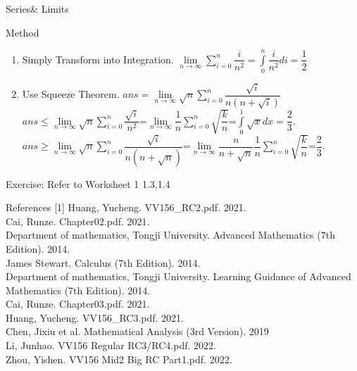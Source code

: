 \documentclass{beamer}
\begin{document}
\begin{frame}{Series\& Limits}
    
    \begin{block}{Method}
    \begin{enumerate}
        \item Simply Transform into Integration.
        $\lim\limits_{n\to\infty}\sum\limits_{i=0}^{n}\dfrac{i}{n^2}=\int\limits_0^n \dfrac{i}{n^2} di=\dfrac{1}{2} $
        \item Use Squeeze Theorem.
        $ans=\lim\limits_{n\to\infty}\sqrt{n}\sum\limits_{i=0}^{n}\dfrac{\sqrt{i}}{n(n+\sqrt{i})}$\\
        $ans\leq\lim\limits_{n\to\infty}\sqrt{n}\sum\limits_{i=0}^{n}\dfrac{\sqrt{i}}{n^2}$=$\lim\limits_{n\to\infty}\dfrac{1}{n}\sum\limits_{i=0}^{n}\sqrt{\dfrac{k}{n}}$=$\int\limits_0^1 \sqrt{x}dx=\dfrac{2}{3}$.\\
        $ans\geq \lim\limits_{n\to\infty}\sqrt{n}\sum\limits_{i=0}^{n}\dfrac{\sqrt{i}}{n(n+\sqrt{n})}$=$\lim\limits_{n\to\infty}\dfrac{n}{n+\sqrt{n}}\dfrac{1}{n}\sum\limits_{i=0}^{n}\sqrt{\dfrac{k}{n}}$=$\dfrac{2}{3}$.
    \end{enumerate}
    \end{block}
    Exercise: Refer to Worksheet 1 1.3,1.4
\end{frame}



\begin{frame}{References}
\footnotesize
    		[1] Huang, Yucheng. VV156\_RC2.pdf. 2021.\\
		\bigskip
		[2] Cai, Runze. Chapter02.pdf. 2021.\\
		\bigskip
		[3] Department of mathematics, Tongji University. Advanced Mathematics (7th Edition). 2014.\\
		\bigskip
		[4] James Stewart. Calculus (7th Edition). 2014.\\
		\bigskip
		[5] Department of mathematics, Tongji University. Learning Guidance of Advanced Mathematics (7th Edition). 2014.\\
\bigskip
		[6] Cai, Runze. Chapter03.pdf. 2021.\\
\bigskip
	[7] Huang, Yucheng. VV156\_RC3.pdf. 2021.\\
	\bigskip
	[8] Chen, Jixiu et al. Mathematical Analysis (3rd Version). 2019\\
	\bigskip
	[9] Li, Junhao. VV156 Regular RC3/RC4.pdf. 2022.\\
	\bigskip
	[10] Zhou, Yishen. VV156 Mid2 Big RC Part1.pdf. 2022.\\
	\normalsize
\end{frame}
\end{document}
